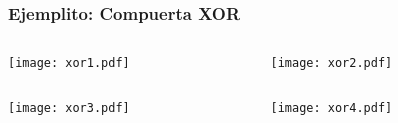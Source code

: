 \begin{frame}
	\frametitle{Ejemplito: Compuerta XOR}
	\vspace{-5mm}
	\begin{columns}
		\begin{column}{0.5\textwidth}
			\begin{center}
				\texttt{[image: xor1.pdf]}
			\end{center}
		\end{column}
		\begin{column}{0.5\textwidth}
			\begin{center}
				\texttt{[image: xor2.pdf]}
			\end{center}
		\end{column}
	\end{columns}

	
	\begin{columns}
		\begin{column}{0.5\textwidth}
			\begin{center}
				\texttt{[image: xor3.pdf]}
			\end{center}
		\end{column}
		\begin{column}{0.5\textwidth}
			\begin{center}
				\texttt{[image: xor4.pdf]}
			\end{center}
		\end{column}
	\end{columns}
\end{frame}
